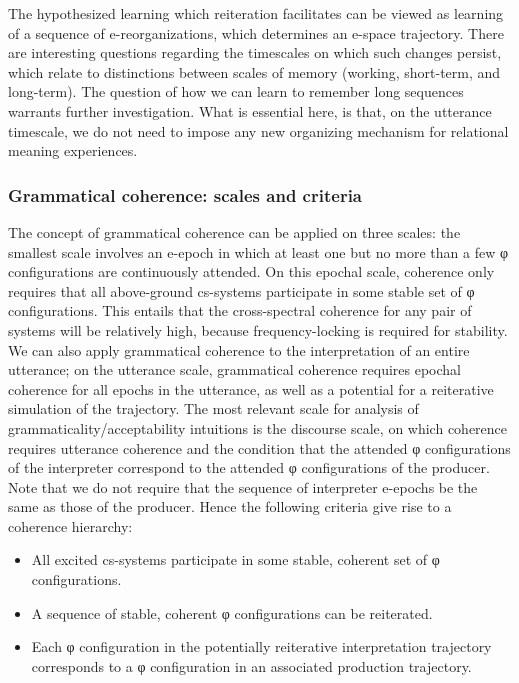   The hypothesized learning which reiteration facilitates can be viewed as learning of a sequence of e-reorganizations, which determines an e-space trajectory. There are interesting questions regarding the timescales on which such changes persist, which relate to distinctions between scales of memory (working, short-term, and long-term). The question of how we can learn to remember long sequences warrants further investigation. What is essential here, is that, on the utterance timescale, we do not need to impose any new organizing mechanism for relational meaning experiences. 

\subsubsection{Grammatical coherence: scales and criteria}

The concept of grammatical coherence can be applied on three scales: the smallest scale involves an e-epoch in which at least one but no more than a few φ configurations are continuously attended. On this epochal scale, coherence only requires that all above-ground cs-systems participate in some stable set of φ configurations. This entails that the cross-spectral coherence for any pair of systems will be relatively high, because frequency-locking is required for stability. We can also apply grammatical coherence to the interpretation of an entire utterance; on the utterance scale, grammatical coherence requires epochal coherence for all epochs in the utterance, as well as a potential for a reiterative simulation of the trajectory. The most relevant scale for analysis of grammaticality/acceptability intuitions is the discourse scale, on which coherence requires utterance coherence and the condition that the attended φ configurations of the interpreter correspond to the attended φ configurations of the producer. Note that we do not require that the sequence of interpreter e-epochs be the same as those of the producer. Hence the following criteria give rise to a coherence hierarchy:

\begin{itemize}
\item 
All excited cs-systems participate in some stable, coherent set of φ configurations.
\item 
A sequence of stable, coherent φ configurations can be reiterated.
\item 
Each φ configuration in the potentially reiterative interpretation trajectory corresponds to a φ configuration in an associated production trajectory.
\end{itemize}

